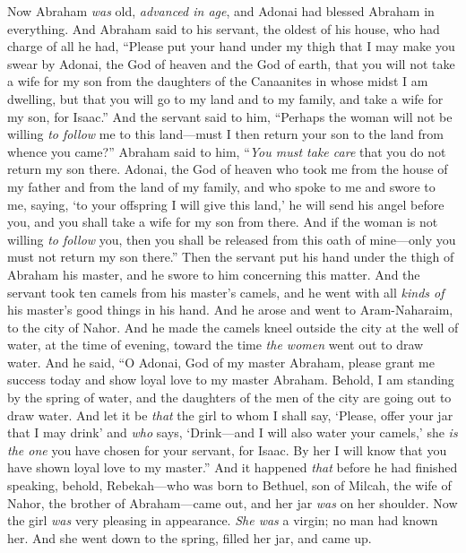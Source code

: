 \begin{biblechapter} %
 Now Abraham \textit{was} old, \textit{advanced in age}, and Adonai had blessed Abraham in everything.
\verse And Abraham said to his servant, the oldest of his house, who had charge of all he had, “Please put your hand under my thigh
\verse that I may make you swear by Adonai, the God of heaven and the God of earth, that you will not take a wife for my son from the daughters of the Canaanites in whose midst I am dwelling,
\verse but that you will go to my land and to my family, and take a wife for my son, for Isaac.”
\verse And the servant said to him, “Perhaps the woman will not be willing \textit{to follow} me to this land—must I then return your son to the land from whence you came?”
\verse Abraham said to him, “\textit{You must take care} that you do not return my son there.
\verse Adonai, the God of heaven who took me from the house of my father and from the land of my family, and who spoke to me and swore to me, saying, ‘to your offspring I will give this land,’ he will send his angel before you, and you shall take a wife for my son from there.
\verse And if the woman is not willing \textit{to follow} you, then you shall be released from this oath of mine—only you must not return my son there.”
\verse Then the servant put his hand under the thigh of Abraham his master, and he swore to him concerning this matter.
\verse And the servant took ten camels from his master’s camels, and he went with all \textit{kinds of} his master’s good things in his hand. And he arose and went to Aram-Naharaim, to the city of Nahor.
\verse And he made the camels kneel outside the city at the well of water, at the time of evening, toward the time \textit{the women} went out to draw water.
\verse And he said, “O Adonai, God of my master Abraham, please grant me success today and show loyal love to my master Abraham.
\verse Behold, I am standing by the spring of water, and the daughters of the men of the city are going out to draw water.
\verse And let it be \textit{that} the girl to whom I shall say, ‘Please, offer your jar that I may drink’ and \textit{who} says, ‘Drink—and I will also water your camels,’ she \textit{is the one} you have chosen for your servant, for Isaac. By her I will know that you have shown loyal love to my master.”
\verse And it happened \textit{that} before he had finished speaking, behold, Rebekah—who was born to Bethuel, son of Milcah, the wife of Nahor, the brother of Abraham—came out, and her jar \textit{was} on her shoulder.
\verse Now the girl \textit{was} very pleasing in appearance. \textit{She was} a virgin; no man had known her. And she went down to the spring, filled her jar, and came up.

\end{biblechapter}
